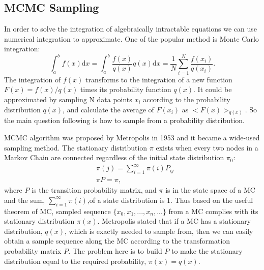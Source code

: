 \documentclass[11pt,twoside,a4paper]{article}
\def\D{\mathrm{d}}
\begin{document}
\subsection{MCMC Sampling}
	\label{sec:mcmc}
	In order to solve the integration of algebraically intractable equations we can use numerical integration to approximate.
	One of the popular method is Monte Carlo integration:
	\begin{equation}
	\int_{a}^{b} f(x) \D x = \int_{a}^{b}\frac{f(x)}{q(x)}q(x)\D x = \dfrac{1}{N}\sum_{i=1}^{N}\frac{f(x_i)}{q(x_i)}.
	\end{equation}
	The integration of $ f(x) $ transforms to the integration of a new function $ F(x) = f(x)/q(x)  $ times its probability function $ q(x) $.
	It could be approximated by sampling N data points $ x_i $ according to the probability distribution $ q(x) $, and calculate the average of $ F(x_i) $ as $ <F(x)>_{q(x)}$.
	So the main question following is how to sample from a probability distribution.
	
	MCMC algorithm was proposed by Metropolis in 1953 and it became a wide-used sampling method.
	The stationary distribution $ \pi $ exists when every two nodes in a Markov Chain are connected regardless of the initial state distribution $ \pi_0 $:
	\begin{equation}
	\begin{aligned}
		&\pi(j) = \sum_{i=1}^{\infty}\pi(i)P_{ij} \\
		&\pi P = \pi,
	\end{aligned}
	\end{equation}
	where $ P $ is the transition probability matrix, and $ \pi $ is in the state space of a MC and the sum, $ \sum_{i=1}^{\infty}\pi(i) $,of a state distribution is 1.
	Thus based on the useful theorem of MC, sampled sequence $ \{x_0, x_1, ..., x_n, ... \}$ from a MC complies with its stationary distribution $ \pi(x) $.
	Metropolis stated that if a MC has a stationary distribution, $ q(x) $, which is exactly needed to sample from, then we can easily obtain a sample sequence along the MC according to the transformation probability matrix $ P $.
	The problem here is to build $ P $ to make the stationary distribution equal to the required probability, $ \pi(x) = q(x) $.
	
\end{document}

